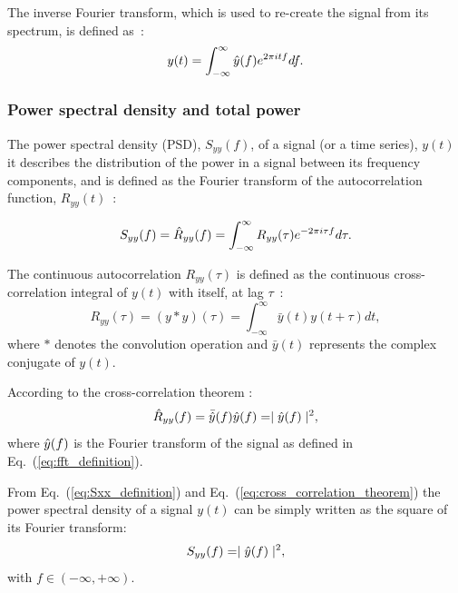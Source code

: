 The inverse Fourier transform, which is used to re-create the signal from its spectrum, is defined as~\cite{a_numerical_recipies}:
\begin{equation}\label{eq:ifft_definition}
y(t) = \int_{-\infty}^{\infty} \hat{y}(f) e^{2\pi {i} t f} df.
\end{equation}

\subsubsection*{Power spectral density and total power} %
The power spectral density (PSD), $S_{yy}(f)$, of a signal (or a time series), $y(t)$ it describes the distribution of the power in a signal between its frequency components, and is defined as the Fourier transform of the autocorrelation function, $R_{yy}(t)$~\cite{b_papoulis1991probability}: %

\begin{equation}\label{eq:Sxx_definition}
    S_{yy}(f) = \hat{R}_{yy}(f) =  \int_{-\infty}^{\infty} R_{yy}(\tau)e^{-2\pi {i} \tau f} d\tau.
\end{equation}

The continuous autocorrelation $R_{yy}(\tau)$ is defined as the continuous cross-correlation integral of $y(t)$ with itself, at lag $\tau$~\cite{FFT_and_applications}:
\begin{equation}\label{eq:Rxx_definition}
    R_{yy}(\tau) = (y \ast y)(\tau) = \int_{-\infty}^{\infty} \bar{y}(t) y(t+\tau) dt,
\end{equation}
where $\ast$ denotes the convolution operation and $\bar{y}(t)$ represents the complex conjugate of $y(t)$.

According to the cross-correlation theorem \cite{FFT_and_applications}:
\begin{equation}\label{eq:cross_correlation_theorem}
\hat{R}_{yy}(f) = \bar{\hat{y}}(f) \hat{y}(f) = \mid \hat{y}(f) \mid ^2,
\end{equation}
where $\hat{y}(f)$ is the Fourier transform of the signal as defined in Eq.~(\ref{eq:fft_definition}).

From Eq.~(\ref{eq:Sxx_definition}) and Eq.~(\ref{eq:cross_correlation_theorem}) the power spectral density of a signal $y(t)$ can be simply written as the square of its Fourier transform:
\begin{equation}\label{eq:Sxx_definition_v2}
S_{yy}(f) = \mid \hat{y}(f) \mid ^2,
\end{equation}
with  $f \in \left(-\infty, +\infty \right )$.

